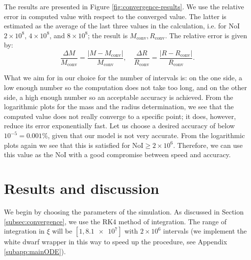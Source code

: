 \documentclass[]{article}
\begin{document}
	The results are presented in Figure \ref{fig:convergence-results}. We use the relative error in computed value with respect to the converged value. The latter is estimated as the average of the last three values in the calculation, i.e. for NoI $2 \times 10^8$, $4 \times 10^8$, and $8 \times 10^8$; the result is $M_\textrm{conv}, R_\textrm{conv}$. The relative error is given by:
	\begin{equation}
		\frac{\Delta M}{M_\mathrm{conv}} = \frac{\left| M - M_\mathrm{conv}\right|}{M_\mathrm{conv}}, \quad \frac{\Delta R}{R_\mathrm{conv}} = \frac{\left| R - R_\mathrm{conv}\right|}{R_\mathrm{conv}}.
	\end{equation}
	
	What we aim for in our choice for the number of intervals is: on the one side, a low enough number so the computation does not take too long, and on the other side, a high enough number so an acceptable accuracy is achieved. From the logarithmic plots for the mass and the radius determination, we see that the computed value does not really converge to a specific point; it does, however, reduce its error exponentially fast. Let us choose a desired accuracy of below $10^{-5} = 0.001 \%$, given that our model is not very accurate. From the logarithmic plots again we see that this is satisfied for $\text{NoI} \geq 2 \times 10^6$. Therefore, we can use this value as the NoI with a good compromise between speed and accuracy.

\section{Results and discussion}\label{sec:results-and-discussion}
	We begin by choosing the parameters of the simulation. As discussed in Section \ref{subsec:convergence}, we use the RK4 method of integration. The range of integration in $\xi$ will be $\left[ 1, \num{8.1e7}\right]$ with $2 \times 10^6$ intervals (we implement the white dwarf wrapper in this way to speed up the procedure, see Appendix \ref{subapp:mainODE}).
\end{document}
